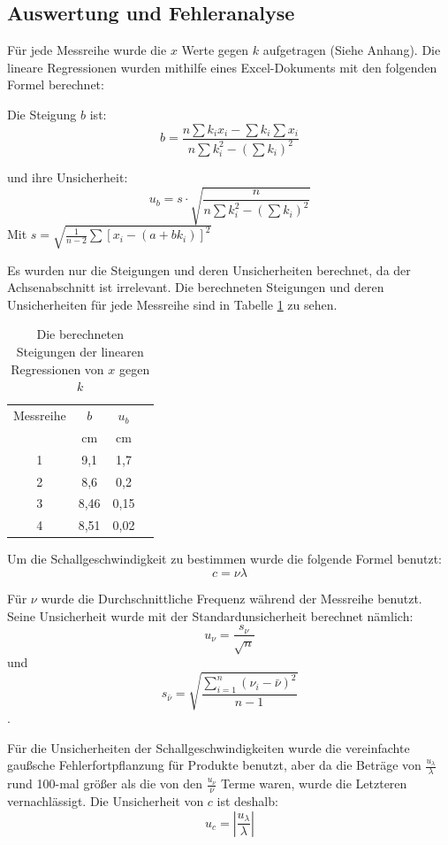 \documentclass[11pt,a4paper]{article}
\begin{document}
\subsection{Auswertung und Fehleranalyse}
Für jede Messreihe wurde die $x$ Werte gegen $k$ aufgetragen (Siehe Anhang). Die lineare Regressionen wurden mithilfe eines Excel-Dokuments mit den folgenden Formel berechnet: 

Die Steigung $b$ ist:
$$ b = \frac{n\sum k_ix_i-\sum k_i \sum x_i}{n \sum k_i^2 - (\sum k_i)^2}$$

und ihre Unsicherheit:
$$u_b = s\cdot \sqrt{\frac{n}{n\sum k_i^2 - (\sum k_i)^2}}$$
Mit 
$s = \sqrt{\frac{1}{n-2}\sum [x_i-(a+bk_i)]^2}$

Es wurden nur die Steigungen und deren Unsicherheiten berechnet, da der Achsenabschnitt ist irrelevant. Die berechneten Steigungen und deren Unsicherheiten für jede Messreihe sind in Tabelle \ref{Table1} zu sehen. 


\begin{table}[h]
	\centering
	\begin{tabular*}{0.50\textwidth}{@{\extracolsep{\fill}}cccc}
		\toprule
		Messreihe & $b$ & $u_b$ \\
		& cm & cm\\
		1 & 9,1 & 1,7 \\
		2 & 8,6 & 0,2 \\
		3 & 8,46 & 0,15 \\
		4 & 8,51 & 0,02 \\
		\bottomrule
	\end{tabular*}
\caption{Die berechneten Steigungen der linearen Regressionen von $x$ gegen $k$}
\label{Table1}
\end{table}

Um die Schallgeschwindigkeit zu bestimmen wurde die folgende Formel benutzt:
$$ c = \nu\lambda$$

Für $\nu$ wurde die Durchschnittliche Frequenz während der Messreihe benutzt. Seine Unsicherheit wurde mit der Standardunsicherheit berechnet nämlich:
$$ u_\nu = \frac{s_\nu}{\sqrt{n}}$$
und
$$ s_{\bar{\nu}} = \sqrt{\frac{\sum_{i=1}^{n}(\nu_i-\bar{\nu})^2}{n-1}}$$.

Für die Unsicherheiten der Schallgeschwindigkeiten wurde die vereinfachte gaußsche Fehlerfortpflanzung für Produkte benutzt, aber da die Beträge von $\frac{u_\lambda}{\lambda}$ rund 100-mal größer als die von den $\frac{u_\nu}{\nu}$ Terme waren, wurde die Letzteren vernachlässigt. Die Unsicherheit von $c$ ist deshalb:
$$ u_c = \left| \frac{u_\lambda}{\lambda}\right|$$
\end{document}
